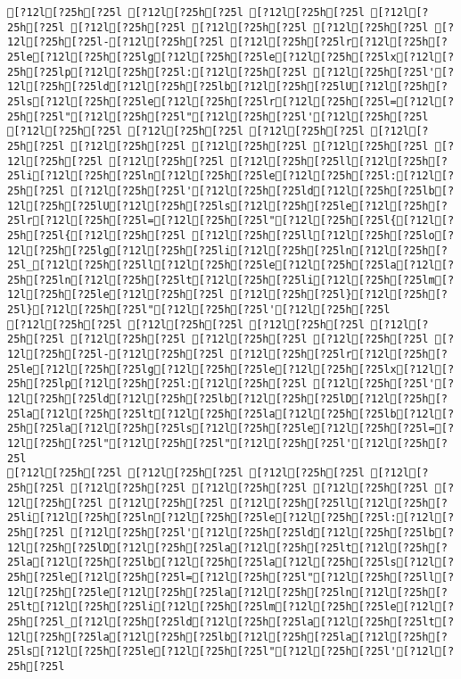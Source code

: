 \documentclass{scrartcl}
\begin{document}
\begin{Verbatim}
[?12l[?25h[?25l [?12l[?25h[?25l [?12l[?25h[?25l [?12l[?25h[?25l [?12l[?25h[?25l [?12l[?25h[?25l [?12l[?25h[?25l [?12l[?25h[?25l-[?12l[?25h[?25l [?12l[?25h[?25lr[?12l[?25h[?25le[?12l[?25h[?25lg[?12l[?25h[?25le[?12l[?25h[?25lx[?12l[?25h[?25lp[?12l[?25h[?25l:[?12l[?25h[?25l [?12l[?25h[?25l'[?12l[?25h[?25ld[?12l[?25h[?25lb[?12l[?25h[?25lU[?12l[?25h[?25ls[?12l[?25h[?25le[?12l[?25h[?25lr[?12l[?25h[?25l=[?12l[?25h[?25l"[?12l[?25h[?25l"[?12l[?25h[?25l'[?12l[?25h[?25l
[?12l[?25h[?25l [?12l[?25h[?25l [?12l[?25h[?25l [?12l[?25h[?25l [?12l[?25h[?25l [?12l[?25h[?25l [?12l[?25h[?25l [?12l[?25h[?25l [?12l[?25h[?25l [?12l[?25h[?25ll[?12l[?25h[?25li[?12l[?25h[?25ln[?12l[?25h[?25le[?12l[?25h[?25l:[?12l[?25h[?25l [?12l[?25h[?25l'[?12l[?25h[?25ld[?12l[?25h[?25lb[?12l[?25h[?25lU[?12l[?25h[?25ls[?12l[?25h[?25le[?12l[?25h[?25lr[?12l[?25h[?25l=[?12l[?25h[?25l"[?12l[?25h[?25l{[?12l[?25h[?25l{[?12l[?25h[?25l [?12l[?25h[?25ll[?12l[?25h[?25lo[?12l[?25h[?25lg[?12l[?25h[?25li[?12l[?25h[?25ln[?12l[?25h[?25l_[?12l[?25h[?25ll[?12l[?25h[?25le[?12l[?25h[?25la[?12l[?25h[?25ln[?12l[?25h[?25lt[?12l[?25h[?25li[?12l[?25h[?25lm[?12l[?25h[?25le[?12l[?25h[?25l [?12l[?25h[?25l}[?12l[?25h[?25l}[?12l[?25h[?25l"[?12l[?25h[?25l'[?12l[?25h[?25l
[?12l[?25h[?25l [?12l[?25h[?25l [?12l[?25h[?25l [?12l[?25h[?25l [?12l[?25h[?25l [?12l[?25h[?25l [?12l[?25h[?25l [?12l[?25h[?25l-[?12l[?25h[?25l [?12l[?25h[?25lr[?12l[?25h[?25le[?12l[?25h[?25lg[?12l[?25h[?25le[?12l[?25h[?25lx[?12l[?25h[?25lp[?12l[?25h[?25l:[?12l[?25h[?25l [?12l[?25h[?25l'[?12l[?25h[?25ld[?12l[?25h[?25lb[?12l[?25h[?25lD[?12l[?25h[?25la[?12l[?25h[?25lt[?12l[?25h[?25la[?12l[?25h[?25lb[?12l[?25h[?25la[?12l[?25h[?25ls[?12l[?25h[?25le[?12l[?25h[?25l=[?12l[?25h[?25l"[?12l[?25h[?25l"[?12l[?25h[?25l'[?12l[?25h[?25l
[?12l[?25h[?25l [?12l[?25h[?25l [?12l[?25h[?25l [?12l[?25h[?25l [?12l[?25h[?25l [?12l[?25h[?25l [?12l[?25h[?25l [?12l[?25h[?25l [?12l[?25h[?25l [?12l[?25h[?25ll[?12l[?25h[?25li[?12l[?25h[?25ln[?12l[?25h[?25le[?12l[?25h[?25l:[?12l[?25h[?25l [?12l[?25h[?25l'[?12l[?25h[?25ld[?12l[?25h[?25lb[?12l[?25h[?25lD[?12l[?25h[?25la[?12l[?25h[?25lt[?12l[?25h[?25la[?12l[?25h[?25lb[?12l[?25h[?25la[?12l[?25h[?25ls[?12l[?25h[?25le[?12l[?25h[?25l=[?12l[?25h[?25l"[?12l[?25h[?25ll[?12l[?25h[?25le[?12l[?25h[?25la[?12l[?25h[?25ln[?12l[?25h[?25lt[?12l[?25h[?25li[?12l[?25h[?25lm[?12l[?25h[?25le[?12l[?25h[?25l_[?12l[?25h[?25ld[?12l[?25h[?25la[?12l[?25h[?25lt[?12l[?25h[?25la[?12l[?25h[?25lb[?12l[?25h[?25la[?12l[?25h[?25ls[?12l[?25h[?25le[?12l[?25h[?25l"[?12l[?25h[?25l'[?12l[?25h[?25l

\end{Verbatim}
\end{document}
